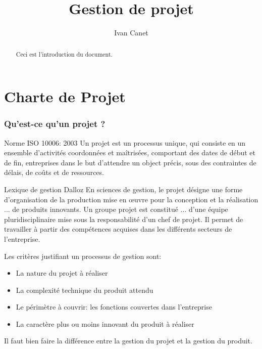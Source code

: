 \documentclass[10pt,a4paper,french]{article}
\begin{document}
\title{Gestion de projet}
\author{Ivan Canet}
\maketitle

\begin{abstract} %
Ceci est l'introduction du document.
\end{abstract}

\tableofcontents

\part{Charte de Projet}

\section{Qu'est-ce qu'un projet ?}

\begin{cquote}{Norme ISO 10006: 2003}
Un projet est un processus unique, qui consiste en un ensemble d'activités coordonnées et maîtrisées, comportant des dates de début et de fin, entreprises dans le but d'attendre un object précis, sous des contraintes de délais, de coûts et de ressources.
\end{cquote}

\begin{cquote}{Lexique de gestion Dalloz}
En sciences de gestion, le projet désigne une forme d'organisation de la production mise en œuvre pour la conception et la réalisation ... de produits innovants. Un groupe projet est constitué ... d'une équipe pluridisciplinaire mise sous la responsabilité d'un chef de projet. Il permet de travailler à partir des compétences acquises dans les différents secteurs de l'entreprise.
\end{cquote}

Les critères justifiant un processus de gestion sont:
\begin{itemize}
\item La nature du projet à réaliser
\item La complexité technique du produit attendu
\item Le périmètre à couvrir: les fonctions couvertes dans l'entreprise
\item La caractère plus ou moins innovant du produit à réaliser
\end{itemize}

Il faut bien faire la différence entre la gestion du projet et la gestion du produit.
\end{document}
